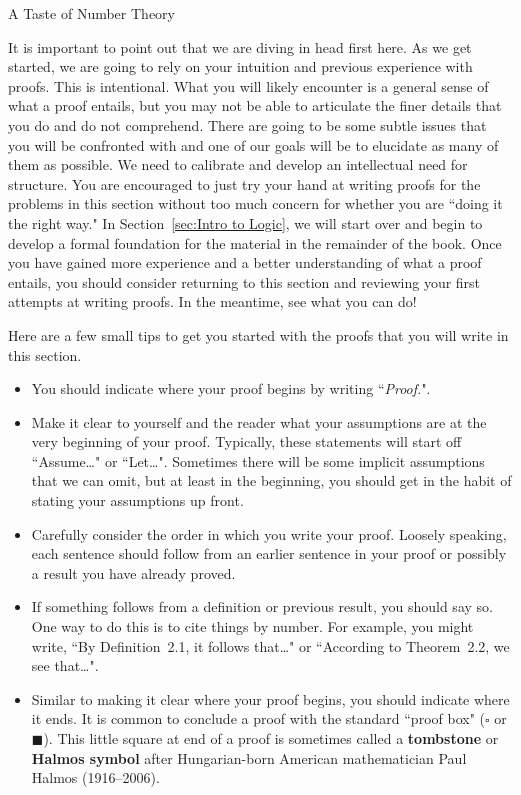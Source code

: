 \begin{section}{A Taste of Number Theory}\label{sec:baby number theory}

It is important to point out that we are diving in head first here.  As we get started, we are going to rely on your intuition and previous experience with proofs.  This is intentional. What you will likely encounter is a general sense of what a proof entails, but you may not be able to articulate the finer details that you do and do not comprehend.  There are going to be some subtle issues that you will be confronted with and one of our goals will be to elucidate as many of them as possible. We need to calibrate and develop an intellectual need for structure.  You are encouraged to just try your hand at writing proofs for the problems in this section without too much concern for whether you are ``doing it the right way." In Section~\ref{sec:Intro to Logic}, we will start over and begin to develop a formal foundation for the material in the remainder of the book. Once you have gained more experience and a better understanding of what a proof entails, you should consider returning to this section and reviewing your first attempts at writing proofs. In the meantime, see what you can do!

Here are a few small tips to get you started with the proofs that you will write in this section.
\begin{itemize}
\item You should indicate where your proof begins by writing ``\emph{Proof.}".
\item Make it clear to yourself and the reader what your assumptions are at the very beginning of your proof. Typically, these statements will start off ``Assume\ldots" or ``Let\ldots". Sometimes there will be some implicit assumptions that we can omit, but at least in the beginning, you should get in the habit of stating your assumptions up front. 
\item Carefully consider the order in which you write your proof. Loosely speaking, each sentence should follow from an earlier sentence in your proof or possibly a result you have already proved.
\item If something follows from a definition or previous result, you should say so.  One way to do this is to cite things by number.  For example, you might write, ``By Definition~2.1, it follows that\ldots" or ``According to Theorem~2.2, we see that\ldots".
\item Similar to making it clear where your proof begins, you should indicate where it ends.  It is common to conclude a proof with the standard ``proof box" ($\square$ or $\blacksquare$).  This little square at end of a proof is sometimes called a \textbf{tombstone} or \textbf{Halmos symbol} after Hungarian-born American mathematician Paul Halmos (1916--2006).
\end{itemize}


\end{section}
